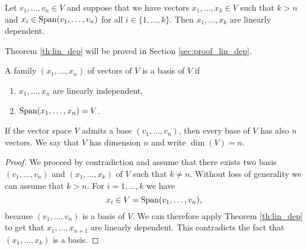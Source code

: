 \documentclass[11pt,nocut]{article}
\begin{document}
\begin{theorem}\label{th:lin_dep}
	Let $v_1, \dots, v_n \in V$ and suppose that we have vectors $x_1, \dots, x_k \in V$ such that $k > n$ and $x_i \in {{\rm Span}}(v_1, \dots, v_n)$ for all $i \in \{1, \dots, k\}$.
	Then $x_1, \dots, x_k$ are linearly dependent.
\end{theorem}
Theorem \ref{th:lin_dep} will be proved in Section \ref{sec:proof_lin_dep}.
\\

\begin{definition}[Basis]
	A family $(x_1, \dots, x_n)$ of vectors of $V$ is a basis of $V$ if
	\begin{enumerate}[label=(\roman*)]
		\item $x_1, \dots, x_n$ are linearly independent,
		\item ${{\rm Span}}(x_1, \dots, x_n) = V$.
	\end{enumerate}
\end{definition}

\begin{definition}[Dimension]
	If the vector space $V$ admits a base $(v_1, \dots, v_n)$, then every base of $V$ has also $n$ vectors. We say that $V$ has dimension $n$ and write $\dim(V) = n$.
\end{definition}
\begin{proof}
	We proceed by contradiction and assume that there exists two basis $(v_1, \dots, v_n)$ and $(x_1, \dots, x_k)$ of $V$ such that $k \neq n$. Without loss of generality we can assume that $k > n$. For $i = 1, \dots, k$ we have
	$$
	x_i \in V = {{\rm Span}}(v_1, \dots, v_n),
	$$
	because $(v_1, \dots, v_n)$ is a basis of $V$. We can therefore apply Theorem \ref{th:lin_dep} to get that $x_1, \dots, x_{n+1}$ are linearly dependent. This contradicts the fact that $(x_1, \dots, x_{k})$ is a basis.
\end{proof}
\\
\end{document}
